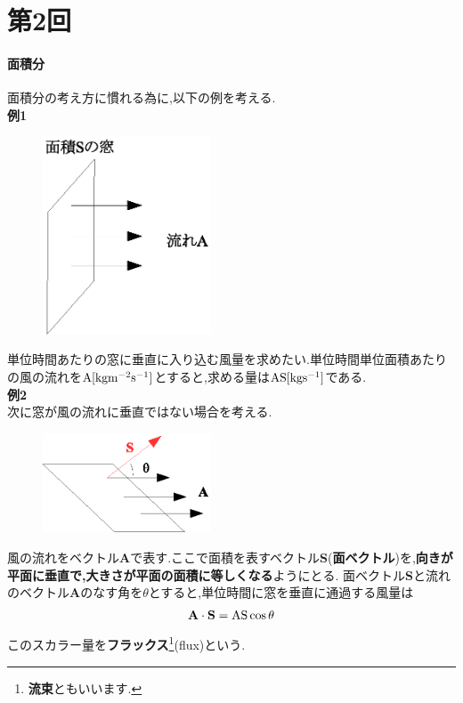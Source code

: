\documentclass[../main]{subfiles}
\begin{document}
\setcounter{eqnarray}{0}
\setcounter{equation}{0}
\setcounter{figure}{0}

\clearpage

\part*{第2回}


\subsection{面積分}
\noindent
面積分の考え方に慣れる為に,以下の例を考える.\\
{\bf 例1}\\
\begin{figure}[htbp]
 \begin{center}
  \includegraphics[width=50mm]{2.1.eps}
 \end{center}
 \caption{}
 \label{fig:one}
\end{figure}
\noindent
単位時間あたりの窓に垂直に入り込む風量を求めたい.単位時間単位面積あたりの風の流れを${\rm A[kgm^{-2}s^{-1}]}$とすると,求める量は${\rm AS[kgs^{-1}]}$である.\\
{\bf 例2}\\
次に窓が風の流れに垂直ではない場合を考える.
\begin{figure}[htbp]
 \begin{center}
  \includegraphics[width=50mm]{2.2.eps}
 \end{center}
 \caption{}
 \label{fig:one}
\end{figure}
風の流れをベクトル{\bf A}で表す.ここで面積を表すベクトル{\bf S}({\bf 面ベクトル})を,{\bf 向きが平面に垂直で,大きさが平面の面積に等しくなる}ようにとる.
面ベクトル{\bf S}と流れのベクトル{\bf A}のなす角を$\theta$とすると,単位時間に窓を垂直に通過する風量は
\begin{equation}
{\bf A}\cdot{\bf S}={\rm AS}\cos \theta
\end{equation}
このスカラー量を{\bf フラックス}\footnote{{\bf 流束}ともいいます.}(flux)という.\\
\end{document}

